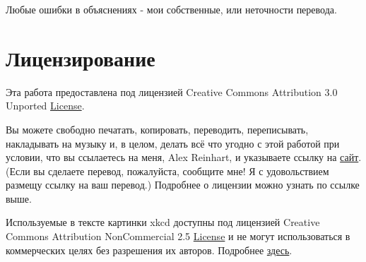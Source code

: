 Любые ошибки в объяснениях - мои собственные, или неточности перевода.

\section{Лицензирование}
\label{chp1:copyleft}

Эта работа предоставлена под лицензией Creative Commons Attribution 3.0 Unported \href{http://creativecommons.org/licenses/by/3.0/}{License}.

Вы можете свободно печатать, копировать, переводить, переписывать, накладывать на музыку и, в целом, делать всё что угодно с этой работой при условии, что вы ссылаетесь на меня, Alex Reinhart, и указываете ссылку на \href{http://statisticsdonewrong.com}{сайт}. (Если вы сделаете перевод, пожалуйста, сообщите мне! Я с удовольствием размещу ссылку на ваш перевод.) Подробнее о лицензии можно узнать по ссылке выше.

Используемые в тексте картинки xkcd доступны под лицензией Creative Commons Attribution NonCommercial 2.5 \href{http://creativecommons.org/licenses/by-nc/2.5/}{License} и не могут использоваться в коммерческих целях без разрешения их авторов. Подробнее \href{http://xkcd.com/license.html}{здесь}.